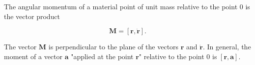 The angular momentum of a material point of unit mass relative to the point $0$ is the vector product

$$\mathbf{M} = [\mathbf{r}, \dot{\mathbf{r}}].$$

The vector $\mathbf{M}$ is perpendicular to the plane of the vectors $\mathbf{r}$ and $\dot{\mathbf{r}}$. In general, the moment of a vector $\mathbf{a}$ "applied at the point $\mathbf{r}$" relative to the point $0$ is $[\mathbf{r}, \mathbf{a}]$.
